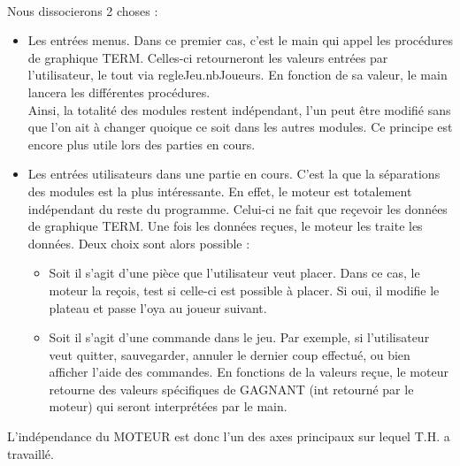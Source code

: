 \documentclass{report}
\begin{document}
        \paragraph*{} %
	Nous dissocierons 2 choses : \\
	\begin{itemize} %
		\item Les entrées menus.
		Dans ce premier cas, c'est le main qui appel les procédures de graphique TERM. Celles-ci retourneront les valeurs entrées par l'utilisateur, le tout via regleJeu.nbJoueurs. En fonction de sa valeur, le main lancera les différentes procédures.\\
		Ainsi, la totalité des modules restent indépendant, l'un peut être modifié sans que l'on ait à changer quoique ce soit dans les autres modules. Ce principe est encore plus utile lors des parties en cours. 
		\item Les entrées utilisateurs dans une partie en cours.
		C'est la que la séparations des modules est la plus intéressante. En effet, le moteur est totalement indépendant du reste du programme. Celui-ci ne fait que reçevoir les données de graphique TERM. 
		Une fois les données reçues, le moteur les traite les données. Deux choix sont alors possible : \\
		\begin{itemize} %
			\item Soit il s'agit d'une pièce que l'utilisateur veut placer. Dans ce cas, le moteur la reçois, test si celle-ci est possible à placer. Si oui, il modifie le plateau et passe l'oya au joueur suivant. 
			\item Soit il s'agit d'une commande dans le jeu. Par exemple, si l'utilisateur veut quitter, sauvegarder, annuler le dernier coup effectué, ou bien afficher l'aide des commandes. En fonctions de la valeurs reçue, le moteur retourne des valeurs spécifiques de GAGNANT (int retourné par le moteur) qui seront interprétées par le main.\\
                \end{itemize}
        \end{itemize}
	
	L'indépendance du MOTEUR est donc l'un des axes principaux sur lequel T.H. a travaillé.\\
		
\end{document}
